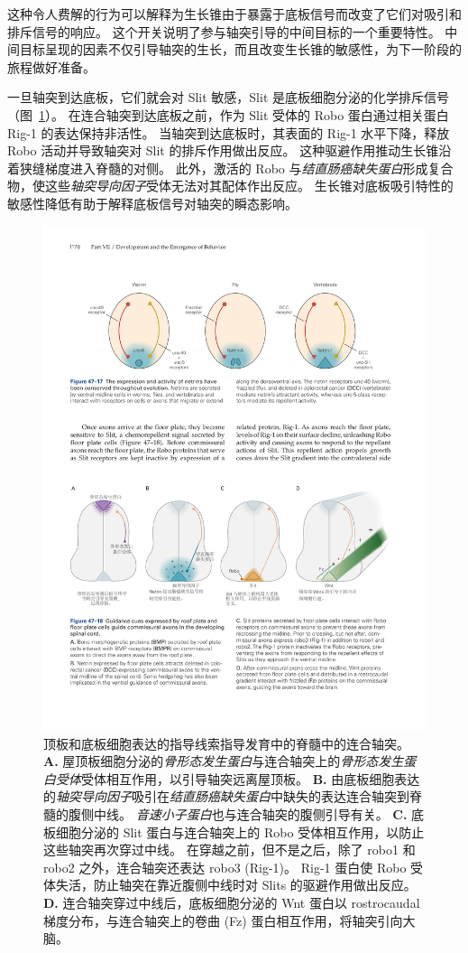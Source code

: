 这种令人费解的行为可以解释为生长锥由于暴露于底板信号而改变了它们对吸引和排斥信号的响应。
这个开关说明了参与轴突引导的中间目标的一个重要特性。
中间目标呈现的因素不仅引导轴突的生长，而且改变生长锥的敏感性，为下一阶段的旅程做好准备。


一旦轴突到达底板，它们就会对 Slit 敏感，Slit 是底板细胞分泌的化学排斥信号（图~\ref{fig:47_18}）。
在连合轴突到达底板之前，作为 Slit 受体的 Robo 蛋白通过相关蛋白 Rig-1 的表达保持非活性。
当轴突到达底板时，其表面的 Rig-1 水平下降，释放 Robo 活动并导致轴突对 Slit 的排斥作用做出反应。
这种驱避作用推动生长锥沿着狭缝梯度进入脊髓的对侧。
此外，激活的 Robo 与\textit{结直肠癌缺失蛋白}形成复合物，使这些\textit{轴突导向因子}受体无法对其配体作出反应。
生长锥对底板吸引特性的敏感性降低有助于解释底板信号对轴突的瞬态影响。


\begin{figure}[htbp]
	\centering
	\includegraphics[width=0.95\linewidth]{chap47/fig_47_18}
	\caption{顶板和底板细胞表达的指导线索指导发育中的脊髓中的连合轴突。
		\textbf{A.} 屋顶板细胞分泌的\textit{骨形态发生蛋白}与连合轴突上的\textit{骨形态发生蛋白受体}受体相互作用，以引导轴突远离屋顶板。
		\textbf{B.} 由底板细胞表达的\textit{轴突导向因子}吸引在\textit{结直肠癌缺失蛋白}中缺失的表达连合轴突到脊髓的腹侧中线。
		\textit{音速小子蛋白}也与连合轴突的腹侧引导有关。
		\textbf{C.} 底板细胞分泌的 Slit 蛋白与连合轴突上的 Robo 受体相互作用，以防止这些轴突再次穿过中线。
		在穿越之前，但不是之后，除了 robo1 和 robo2 之外，连合轴突还表达 robo3 (Rig-1)。
		Rig-1 蛋白使 Robo 受体失活，防止轴突在靠近腹侧中线时对 Slits 的驱避作用做出反应。
		\textbf{D.} 连合轴突穿过中线后，底板细胞分泌的 Wnt 蛋白以 rostrocaudal 梯度分布，与连合轴突上的卷曲 (Fz) 蛋白相互作用，将轴突引向大脑。}
	\label{fig:47_18}
\end{figure}


